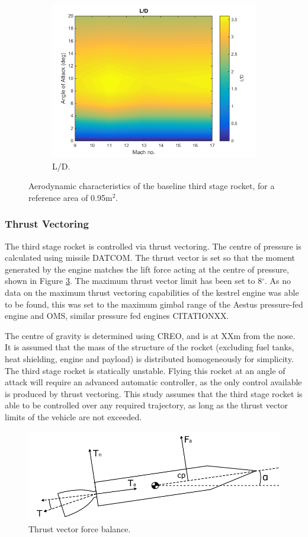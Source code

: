\begin{figure}
\begin{subfigure}{.5\textwidth}
				\includegraphics[width=0.99\linewidth]{figures/3_vehicle_design/ThirdStageLD}
				\caption{L/D.}
				\label{fig:LD-ThirdStage}
			\end{subfigure}
			\caption{Aerodynamic characteristics of the baseline third stage rocket, for a reference area of 0.95m$^2$.}
			\label{fig:ThirdStageAero}
		\end{figure}
		
		
		
		\subsubsection{Thrust Vectoring}
		
		The third stage rocket is controlled via thrust vectoring. The centre of pressure is calculated using missile DATCOM. The thrust vector is set so that the moment generated by the engine matches the lift force acting at the centre of pressure, shown in Figure \ref{fig:ThrustVec}. The maximum thrust vector limit has been set to 8$^\circ$. As no data on the maximum thrust vectoring capabilities of the kestrel engine was able to be found, this was set to the maximum gimbal range of the Aestus pressure-fed engine and OMS, similar pressure fed engines CITATIONXX.
		
			The centre of gravity is determined using CREO, and is at XXm from the nose. It is assumed that the mass of the structure of the rocket (excluding fuel tanks, heat shielding, engine and payload) is distributed homogeneously for simplicity.
		The third stage rocket is statically unstable. Flying this rocket at an angle of attack will require an advanced automatic controller, as the only control available is produced by thrust vectoring. This study assumes that the third stage rocket is able to be controlled over any required trajectory, as long as the thrust vector limits of the vehicle are not exceeded. 
		
		
\begin{figure}
\centering
\includegraphics[width=0.6\linewidth]{figures/3_vehicle_design/ThrustVec}
\caption{Thrust vector force balance.}
\label{fig:ThrustVec}
\end{figure}
		

		